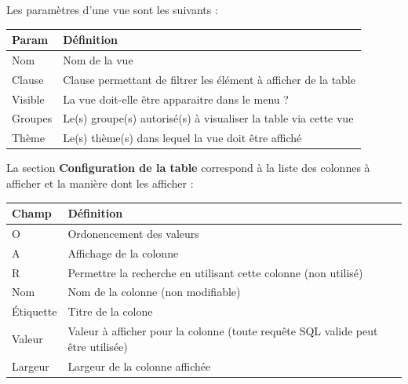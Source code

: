 \documentclass[letterpaper,10pt,english]{sphinxmanual}
\begin{document}

Les paramètres d'une vue sont les suivants :

\begin{tabulary}{\linewidth}{|L|L|}
\hline

\textbf{Param}
 & 
\textbf{Définition}
\\
\hline
Nom
 & 
Nom de la vue
\\
\hline
Clause
 & 
Clause permettant de filtrer les élément à afficher de la table
\\
\hline
Visible
 & 
La vue doit-elle être apparaitre dans le menu ?
\\
\hline
Groupes
 & 
Le(s) groupe(s) autorisé(s) à visualiser la table via cette vue
\\
\hline
Thème
 & 
Le(s) thème(s) dans lequel la vue doit être affiché
\\
\hline\end{tabulary}


La section \textbf{Configuration de la table} correspond à  la liste des
colonnes à afficher et la manière dont les afficher :

\begin{tabulary}{\linewidth}{|L|L|}
\hline

\textbf{Champ}
 & 
\textbf{Définition}
\\
\hline
O
 & 
Ordonencement des valeurs
\\
\hline
A
 & 
Affichage de la colonne
\\
\hline
R
 & 
Permettre la recherche en utilisant cette colonne (non utilisé)
\\
\hline
Nom
 & 
Nom de la colonne (non modifiable)
\\
\hline
Étiquette
 & 
Titre de la colone
\\
\hline
Valeur
 & 
Valeur à afficher pour la colonne (toute requête SQL valide peut être utilisée)
\\
\hline
Largeur
 & 
Largeur de la colonne affichée
\\
\hline\end{tabulary}
\end{document}
